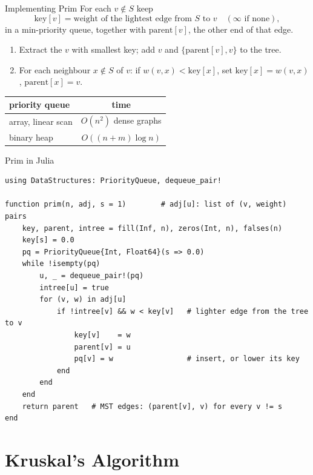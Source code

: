 \documentclass[10pt,aspectratio=169]{beamer}
\begin{document}
\begin{frame}{Implementing Prim}
  For each $v \notin S$ keep
  \[
    \text{key}[v] = \text{weight of the lightest edge from } S \text{ to } v
    \quad (\infty \text{ if none}),
  \]
  in a min-priority queue, together with $\text{parent}[v]$, the other end
  of that edge.

  \bigskip
  \begin{enumerate}
    \item Extract the $v$ with smallest key; add $v$ and
          $\{\text{parent}[v], v\}$ to the tree.
    \item For each neighbour $x \notin S$ of $v$: if $w(v, x) < \text{key}[x]$,
          set $\text{key}[x] = w(v, x)$, $\text{parent}[x] = v$.
  \end{enumerate}

  \bigskip
  \begin{center}
  \begin{tabular}{lc}
    \toprule
    priority queue & time \\
    \midrule
    array, linear scan & $O(n^2)$ \hfill dense graphs \\
    binary heap & $O((n + m) \log n)$ \\
    \bottomrule
  \end{tabular}
  \end{center}
\end{frame}

\begin{frame}[fragile]{Prim in Julia}
\begin{lstlisting}[basicstyle=\ttfamily\scriptsize]
using DataStructures: PriorityQueue, dequeue_pair!

function prim(n, adj, s = 1)        # adj[u]: list of (v, weight) pairs
    key, parent, intree = fill(Inf, n), zeros(Int, n), falses(n)
    key[s] = 0.0
    pq = PriorityQueue{Int, Float64}(s => 0.0)
    while !isempty(pq)
        u, _ = dequeue_pair!(pq)
        intree[u] = true
        for (v, w) in adj[u]
            if !intree[v] && w < key[v]   # lighter edge from the tree to v
                key[v]    = w
                parent[v] = u
                pq[v] = w                 # insert, or lower its key
            end
        end
    end
    return parent   # MST edges: (parent[v], v) for every v != s
end
\end{lstlisting}
\end{frame}

\section{Kruskal's Algorithm}
\end{document}
